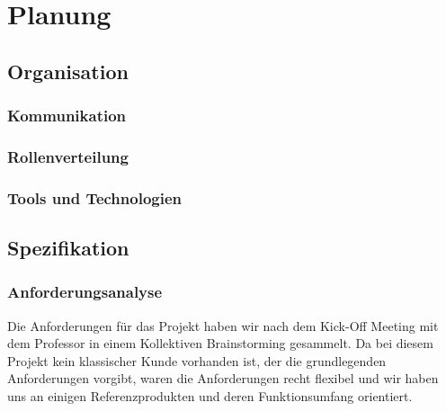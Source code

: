 \chapter{Planung}
\section{Organisation}
\subsection{Kommunikation}
\subsection{Rollenverteilung}
\subsection{Tools und Technologien}
\section{Spezifikation}
\subsection{Anforderungsanalyse}
Die Anforderungen für das Projekt haben wir nach dem Kick-Off Meeting mit dem Professor in einem Kollektiven Brainstorming gesammelt. Da bei diesem Projekt kein klassischer Kunde vorhanden ist, der die grundlegenden Anforderungen vorgibt, waren die Anforderungen recht flexibel und wir haben uns an einigen Referenzprodukten und deren Funktionsumfang orientiert.
